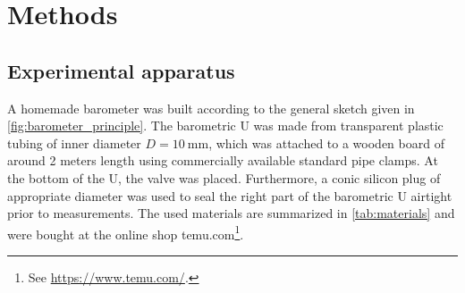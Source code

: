 \documentclass[a4paper,10pt, twocolumn]{article}
\begin{document}
\section{Methods}
\subsection{Experimental apparatus}
A homemade barometer was built according to the general sketch given in \cref{fig:barometer_principle}. The barometric U was made from transparent plastic tubing of inner diameter $D = \SI{10}{\milli\meter}$, which was attached to a wooden board of around 2 meters length using commercially available standard pipe clamps. At the bottom of the U, the valve was placed. Furthermore, a conic silicon plug of appropriate diameter was used to seal the right part of the barometric U airtight prior to measurements. The used materials are summarized in \cref{tab:materials} and were bought at the online shop temu.com\footnote{See \url{https://www.temu.com/}.}.
\end{document}

